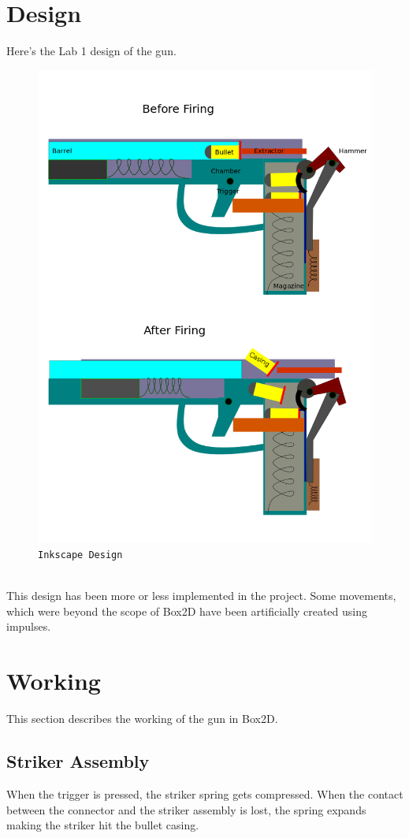 \documentclass{article}
\begin{document}
\section{Design}
Here's the Lab 1 design of the gun.
\\
\begin{figure}[hbtp]
\centering
\includegraphics[scale=0.3]{gun.png}
\caption{\texttt{Inkscape Design}}
\end{figure}
\\
This design has been more or less implemented in the project. Some movements, which were beyond the scope of Box2D have been artificially created using impulses.
\pagebreak
\section{Working}
This section describes the working of the gun in Box2D.
\subsection{Striker Assembly}
When the trigger is pressed, the striker spring gets compressed. When the contact between the connector and the striker assembly is lost, the spring expands making the striker hit the bullet casing.
\end{document}
